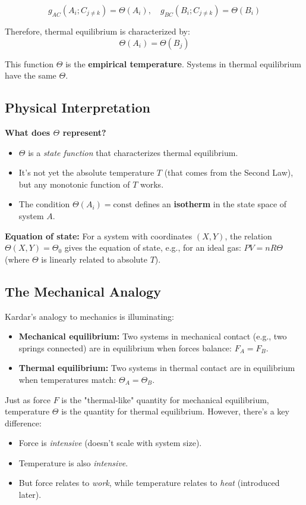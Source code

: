 \documentclass[9pt,twocoloumn]{article}
\begin{document}
\begin{equation}
g_{AC}(A_i; C_{j \neq k}) = \Theta(A_i), \quad g_{BC}(B_i; C_{j \neq k}) = \Theta(B_i)
\end{equation}

Therefore, thermal equilibrium is characterized by:
\begin{equation}
\boxed{\Theta(A_i) = \Theta(B_j)}
\end{equation}

This function $\Theta$ is the \textbf{empirical temperature}. Systems in thermal equilibrium have the same $\Theta$.

\subsection{Physical Interpretation}

\textbf{What does $\Theta$ represent?}
\begin{itemize}
    \item $\Theta$ is a \emph{state function} that characterizes thermal equilibrium.
    \item It's not yet the absolute temperature $T$ (that comes from the Second Law), but any monotonic function of $T$ works.
    \item The condition $\Theta(A_i) = \text{const}$ defines an \textbf{isotherm} in the state space of system $A$.
\end{itemize}

\textbf{Equation of state:} For a system with coordinates $(X, Y)$, the relation $\Theta(X, Y) = \Theta_0$ gives the equation of state, e.g., for an ideal gas: $PV = nR\Theta$ (where $\Theta$ is linearly related to absolute $T$).

\subsection{The Mechanical Analogy}
Kardar's analogy to mechanics is illuminating:

\begin{itemize}
    \item \textbf{Mechanical equilibrium:} Two systems in mechanical contact (e.g., two springs connected) are in equilibrium when forces balance: $F_A = F_B$.
    \item \textbf{Thermal equilibrium:} Two systems in thermal contact are in equilibrium when temperatures match: $\Theta_A = \Theta_B$.
\end{itemize}

Just as force $F$ is the "thermal-like" quantity for mechanical equilibrium, temperature $\Theta$ is the quantity for thermal equilibrium. However, there's a key difference:
\begin{itemize}
    \item Force is \emph{intensive} (doesn't scale with system size).
    \item Temperature is also \emph{intensive}.
    \item But force relates to \emph{work}, while temperature relates to \emph{heat} (introduced later).
\end{itemize}
\end{document}
